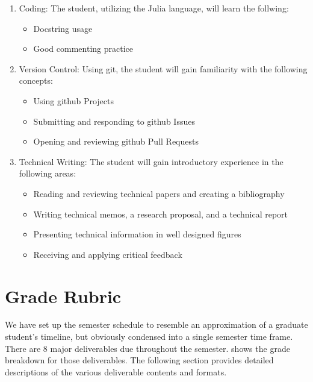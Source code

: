 \documentclass[12pt]{article}
\begin{document}
\begin{enumerate}
	\item Coding: The student, utilizing the Julia language, will learn the follwing:
	\begin{itemize}
		\item Docstring usage
		\item Good commenting practice
	\end{itemize}
	\item Version Control: Using git, the student will gain familiarity with the following concepts:
	\begin{itemize}
		\item Using github Projects
		\item Submitting and responding to github Issues
		\item Opening and reviewing github Pull Requests
	\end{itemize}
	\item Technical Writing: The student will gain introductory experience in the following areas:
	\begin{itemize}
		\item Reading and reviewing technical papers and creating a bibliography
		\item Writing technical memos, a research proposal, and a technical report
		\item Presenting technical information in well designed figures
		\item Receiving and applying critical feedback
	\end{itemize}
\end{enumerate}





\section{Grade Rubric}
\label{sec:graderubric}

We have set up the semester schedule to resemble an approximation of a graduate student's timeline, but obviously condensed into a single semester time frame.
There are 8 major deliverables due throughout the semester.
 shows the grade breakdown for those deliverables.
The following section provides detailed descriptions of the various deliverable contents and formats.
\end{document}
